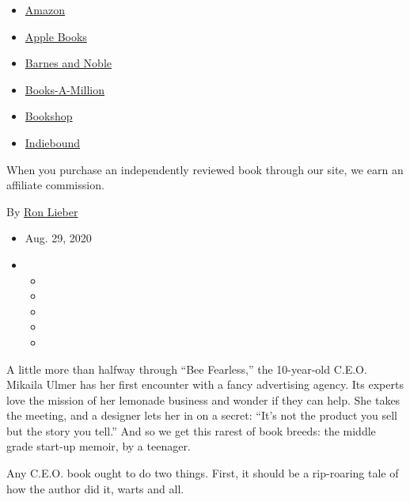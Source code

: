 \begin{itemize}
\tightlist
\item
  \href{https://www.amazon.com/gp/search?index=books\&tag=NYTBSREV-20\&field-keywords=Bee+Fearless\%3A+Dream+Like+a+Kid+Mikaila+Ulmer}{Amazon}
\item
  \href{https://du-gae-books-dot-nyt-du-prd.appspot.com/buy?title=Bee+Fearless\%3A+Dream+Like+a+Kid\&author=Mikaila+Ulmer}{Apple
  Books}
\item
  \href{https://www.anrdoezrs.net/click-7990613-11819508?url=https\%3A\%2F\%2Fwww.barnesandnoble.com\%2Fw\%2F\%3Fean\%3D9781984815088}{Barnes
  and Noble}
\item
  \href{https://www.anrdoezrs.net/click-7990613-35140?url=https\%3A\%2F\%2Fwww.booksamillion.com\%2Fp\%2FBee\%2BFearless\%253A\%2BDream\%2BLike\%2Ba\%2BKid\%2FMikaila\%2BUlmer\%2F9781984815088}{Books-A-Million}
\item
  \href{https://bookshop.org/a/3546/9781984815088}{Bookshop}
\item
  \href{https://www.indiebound.org/book/9781984815088?aff=NYT}{Indiebound}
\end{itemize}

When you purchase an independently reviewed book through our site, we
earn an affiliate commission.

By \href{https://www.nytimes3xbfgragh.onion/by/ron-lieber}{Ron Lieber}

\begin{itemize}
\item
  Aug. 29, 2020
\item
  \begin{itemize}
  \item
  \item
  \item
  \item
  \item
  \end{itemize}
\end{itemize}

A little more than halfway through ``Bee Fearless,'' the 10-year-old
C.E.O. Mikaila Ulmer has her first encounter with a fancy advertising
agency. Its experts love the mission of her lemonade business and wonder
if they can help. She takes the meeting, and a designer lets her in on a
secret: ``It's not the product you sell but the story you tell.'' And so
we get this rarest of book breeds: the middle grade start-up memoir, by
a teenager.

Any C.E.O. book ought to do two things. First, it should be a
rip-roaring tale of how the author did it, warts and all.


